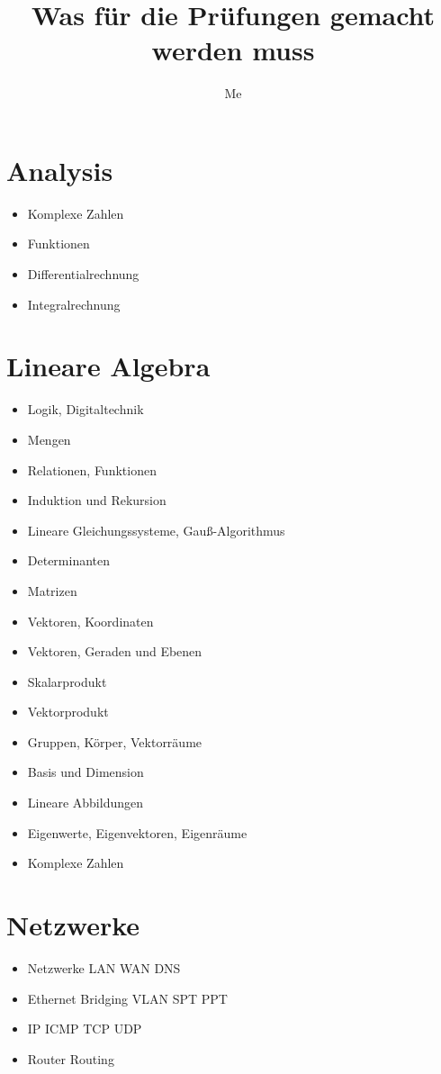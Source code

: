 \documentclass[a4paper]{scrartcl}
\author{Me}
\title{Was für die Prüfungen gemacht werden muss}
\begin{document}
    \section{Analysis}
        \begin{itemize}
            \item Komplexe Zahlen
            \item Funktionen
            \item Differentialrechnung
            \item Integralrechnung
        \end{itemize}
    \section{Lineare Algebra}
        \begin{itemize}
            \item Logik, Digitaltechnik
            \item Mengen
            \item Relationen, Funktionen
            \item Induktion und Rekursion
            \item Lineare Gleichungssysteme, Gauß-Algorithmus
            \item Determinanten
            \item Matrizen
            \item Vektoren, Koordinaten
            \item Vektoren, Geraden und Ebenen
            \item Skalarprodukt
            \item Vektorprodukt
            \item Gruppen, Körper, Vektorräume
            \item Basis und Dimension
            \item Lineare Abbildungen
            \item Eigenwerte, Eigenvektoren, Eigenräume
            \item Komplexe Zahlen
        \end{itemize}
    \section{Netzwerke}
        \begin{itemize}
            \item Netzwerke LAN WAN DNS 
            \item Ethernet Bridging VLAN SPT PPT
            \item IP ICMP TCP UDP
            \item Router Routing
        \end{itemize}
\end{document}
